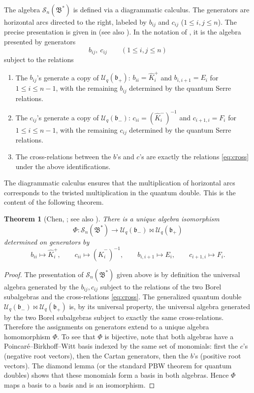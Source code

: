 \documentclass{article}
\newtheorem{theorem}{Theorem}[section]
\theoremstyle{definition}
\newcommand{\Uc}{\mathcal{U}}
\newcommand{\bcS}{\mathcal{S}}
\newcommand{\fB}{\mathfrak{B}}
\newcommand{\fb}{\mathfrak{b}}
\newcommand{\bipr}{\bowtie}
\begin{document}
The algebra $\bcS_n(\fB^*)$ is defined via a diagrammatic calculus. The generators are horizontal arcs directed to the right, labeled by $b_{ij}$ and $c_{ij}$ ($1\le i,j\le n$). The precise presentation is given in \cite[Definition~2.1]{Chen} (see also \cite[Section~3]{ChenGeneral}). In the notation of \cite{CambridgeBorel}, it is the algebra presented by generators
\[
b_{ij},\ c_{ij}\qquad (1\le i,j\le n)
\]
subject to the relations
\begin{enumerate}
\item The $b_{ij}$'s generate a copy of $\Uc_q(\fb_+)$: $b_{ii}=\hat K_i^+$ and $b_{i,i+1}=E_i$ for $1\le i\le n-1$, with the remaining $b_{ij}$ determined by the quantum Serre relations.
\item The $c_{ij}$'s generate a copy of $\Uc_q(\fb_-)$: $c_{ii}=(\hat K_i^-)^{-1}$ and $c_{i+1,i}=F_i$ for $1\le i\le n-1$, with the remaining $c_{ij}$ determined by the quantum Serre relations.
\item The cross-relations between the $b$'s and $c$'s are exactly the relations \eqref{eq:cross} under the above identifications.
\end{enumerate}
The diagrammatic calculus ensures that the multiplication of horizontal arcs corresponds to the twisted multiplication in the quantum double. This is the content of the following theorem.

\begin{theorem}[{Chen, \cite[Theorem~3.5]{Chen}; see also \cite[Theorem~2.4]{ChenGeneral}}]\label{thm:iso}
There is a unique algebra isomorphism
\[
\Phi:\bcS_n(\fB^*)\longrightarrow \Uc_q(\fb_-)\bipr \Uc_q(\fb_+)
\]
determined on generators by
\[
b_{ii}\longmapsto \hat K_i^+,\qquad c_{ii}\longmapsto (\hat K_i^-)^{-1},\qquad
b_{i,i+1}\longmapsto E_i,\qquad c_{i+1,i}\longmapsto F_i.
\]
\end{theorem}

\begin{proof}
The presentation of $\bcS_n(\fB^*)$ given above is by definition the universal algebra generated by the $b_{ij},c_{ij}$ subject to the relations of the two Borel subalgebras and the cross-relations \eqref{eq:cross}. The generalized quantum double $\Uc_q(\fb_-)\bipr \Uc_q(\fb_+)$ is, by its universal property, the universal algebra generated by the two Borel subalgebras subject to exactly the same cross-relations. Therefore the assignments on generators extend to a unique algebra homomorphism $\Phi$. To see that $\Phi$ is bijective, note that both algebras have a Poincar\'e--Birkhoff--Witt basis indexed by the same set of monomials: first the $c$'s (negative root vectors), then the Cartan generators, then the $b$'s (positive root vectors). The diamond lemma (or the standard PBW theorem for quantum doubles) shows that these monomials form a basis in both algebras. Hence $\Phi$ maps a basis to a basis and is an isomorphism.
\end{proof}
\end{document}
